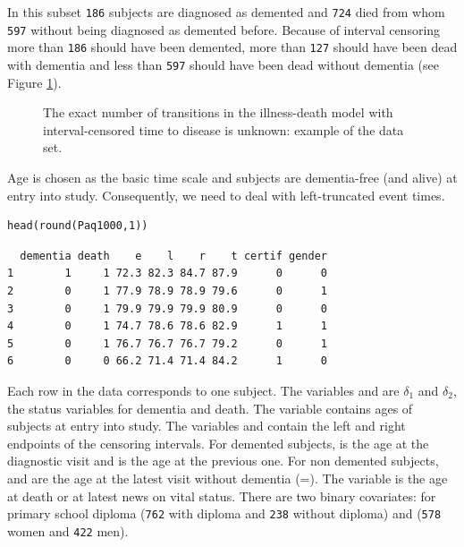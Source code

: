 \documentclass[article]{jss}
\begin{document}
In this subset \texttt{186} subjects are diagnosed as demented
and \texttt{724} died from whom \texttt{597} without
being diagnosed as demented before. Because of interval censoring 
more than \texttt{186} should have been demented, more than
\texttt{127} should have been dead with dementia and
less than \texttt{597} should have been dead without dementia
(see Figure \ref{fig:2}).
\begin{center}
\begin{figure}
\centering
{}
\caption{The exact number of transitions in the illness-death model with interval-censored time to disease is unknown: example of the  data set.}
\label{fig:2}
\end{figure}
\end{center}

Age is chosen as the basic time scale and subjects are dementia-free
(and alive) at entry into study.  Consequently, we need to deal with
left-truncated event times.

\lstset{language=R,label= ,caption= ,numbers=none}
\begin{lstlisting}
head(round(Paq1000,1))
\end{lstlisting}

\begin{verbatim}
  dementia death    e    l    r    t certif gender
1        1     1 72.3 82.3 84.7 87.9      0      0
2        0     1 77.9 78.9 78.9 79.6      0      1
3        0     1 79.9 79.9 79.9 80.9      0      0
4        0     1 74.7 78.6 78.6 82.9      1      1
5        0     1 76.7 76.7 76.7 79.2      0      1
6        0     0 66.2 71.4 71.4 84.2      1      0
\end{verbatim}

Each row in the data corresponds to one subject.  The variables
 and  are  \(\delta_1\) and \(\delta_2\), 
the status variables for dementia and death.
The variable  contains ages of subjects at entry into
study. The variables  and  contain the left and right
endpoints of the censoring intervals.  For demented subjects, 
is the age at the diagnostic visit and  is the age at the
previous one.  For non demented subjects,  and  are
the age at the latest visit without dementia (=).  The
variable  is the age at death or at latest news on vital
status.  There are two binary covariates:  for primary
school diploma (\texttt{762} with diploma and \texttt{238}
without diploma) and  (\texttt{578} women and
\texttt{422} men).
\end{document}
